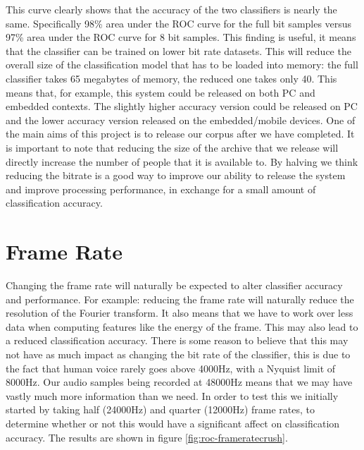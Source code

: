 \documentclass[ %
                    author={Sam Phippen},
                supervisor={Dr. Rafal Bogacz},
                     title={Real time voice activity detectors in noisy personal computing environments},
                  subtitle={},
                    degree={MEng},
                      year={2012} ]{thesis}
\begin{document}
This curve clearly shows that the accuracy of the two classifiers is nearly the
same. Specifically 98\% area under the ROC curve for the full bit samples
versus 97\% area under the ROC curve for 8 bit samples. This finding is useful,
it means that the classifier can be trained on lower bit rate datasets. This
will reduce the overall size of the classification model that has to be loaded
into memory: the full classifier takes 65 megabytes of memory, the reduced one
takes only 40.  This means that, for example, this system could be released on
both PC and embedded contexts. The slightly higher accuracy version could be
released on PC and the lower accuracy version released on the embedded/mobile
devices. One of the main aims of this project is to release our corpus after we
have completed.  It is important to note that reducing the size of the archive
that we release will directly increase the number of people that it is
available to. By halving we think reducing the bitrate is a good way to improve
our ability to release the system and improve processing performance, in exchange
for a small amount of classification accuracy.

\section{Frame Rate}

Changing the frame rate will naturally be expected to alter classifier accuracy
and performance. For example: reducing the frame rate will naturally reduce the
resolution of the Fourier transform. It also means that we have to work over
less data when computing features like the energy of the frame. This may also
lead to a reduced classification accuracy. There is some reason to believe that
this may not have as much impact as changing the bit rate of the classifier,
this is due to the fact that human voice rarely goes above 4000Hz, with a
Nyquist limit of 8000Hz. Our audio samples being recorded at 48000Hz means that
we may have vastly much more information than we need. In order to test this we
initially started by taking half (24000Hz) and quarter (12000Hz) frame rates,
to determine whether or not this would have a significant affect on
classification accuracy. The results are shown in figure
\ref{fig:roc-frameratecrush}.
\end{document}
